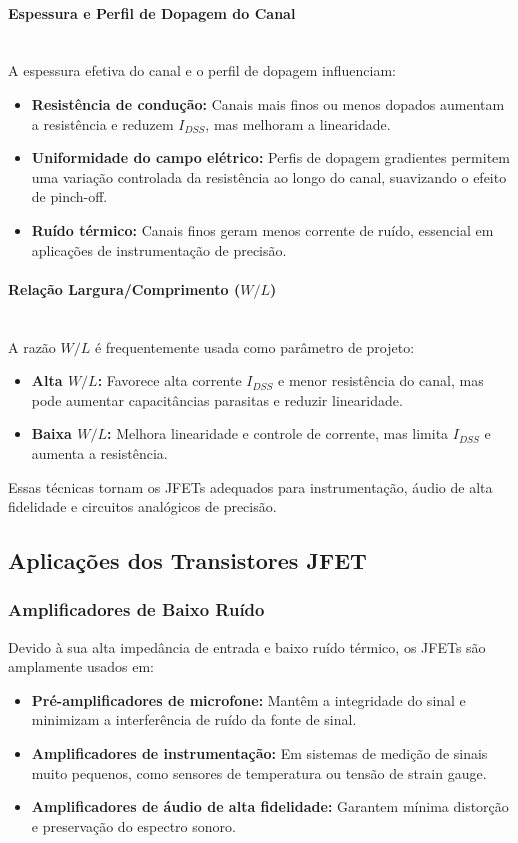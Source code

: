 \documentclass[12pt]{article}
\newcommand{\subsubsubsection}[1]{%
  \paragraph{#1}\mbox{}\\
}
\begin{document}
\subsubsubsection{Espessura e Perfil de Dopagem do Canal}

A espessura efetiva do canal e o perfil de dopagem influenciam:

\begin{itemize}
    \item \textbf{Resistência de condução:} Canais mais finos ou menos dopados aumentam a resistência e reduzem \(I_{DSS}\), mas melhoram a linearidade.

    \item \textbf{Uniformidade do campo elétrico:} Perfis de dopagem gradientes permitem uma variação controlada da resistência ao longo do canal, suavizando o efeito de pinch-off.

    \item \textbf{Ruído térmico:} Canais finos geram menos corrente de ruído, essencial em aplicações de instrumentação de precisão.
\end{itemize}

\subsubsubsection{Relação Largura/Comprimento (\(W/L\))}

A razão \(W/L\) é frequentemente usada como parâmetro de projeto:

\begin{itemize}
    \item \textbf{Alta \(W/L\):} Favorece alta corrente \(I_{DSS}\) e menor resistência do canal, mas pode aumentar capacitâncias parasitas e reduzir linearidade.

    \item \textbf{Baixa \(W/L\):} Melhora linearidade e controle de corrente, mas limita \(I_{DSS}\) e aumenta a resistência.
\end{itemize}

Essas técnicas tornam os JFETs adequados para instrumentação, áudio de alta fidelidade e circuitos analógicos de precisão.

\subsection{Aplicações dos Transistores JFET}

\subsubsection{Amplificadores de Baixo Ruído}

Devido à sua alta impedância de entrada e baixo ruído térmico, os JFETs são amplamente usados em:

\begin{itemize}
    \item \textbf{Pré-amplificadores de microfone:} Mantêm a integridade do sinal e minimizam a interferência de ruído da fonte de sinal.

    \item \textbf{Amplificadores de instrumentação:} Em sistemas de medição de sinais muito pequenos, como sensores de temperatura ou tensão de strain gauge.

    \item \textbf{Amplificadores de áudio de alta fidelidade:} Garantem mínima distorção e preservação do espectro sonoro.
\end{itemize}
\end{document}
